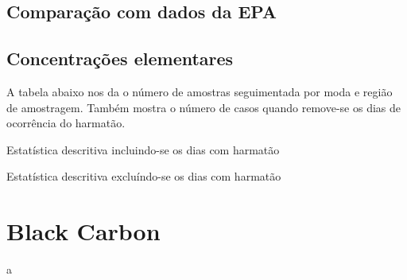 \subsection{Comparação com dados da EPA}


\subsection{Concentrações elementares}
A tabela abaixo nos da o número de amostras seguimentada por
moda e região de amostragem. 
Também mostra o número de casos quando remove-se os dias de ocorrência do harmatão.

\begin{table}[H]
 \centering
  
  \caption{Estatística descritiva incluindo-se os dias com harmatão}
\end{table}

\begin{table}[H]
  \centering
  
  \caption{Estatística descritiva excluíndo-se os dias com harmatão}
\end{table}

\section{Black Carbon}
a


